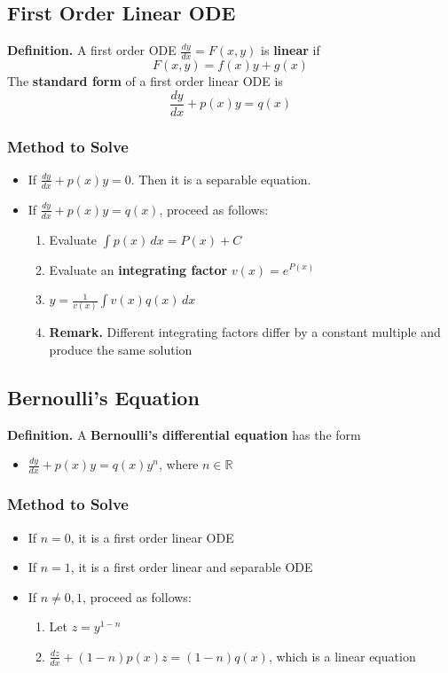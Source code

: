 \documentclass[../ma2002_notes.tex]{subfiles}
\begin{document}
\subsection{First Order Linear ODE}
\textbf{Definition.} A first order ODE \(\displaystyle\frac{dy}{dx}=F(x,y)\) is \textbf{linear} if
\[F(x,y)=f(x)y+g(x)\]
The \textbf{standard form} of a first order linear ODE is
\[\frac{dy}{dx}+p(x)y=q(x)\]

\subsubsection{Method to Solve}
\begin{itemize}
	\item If \(\displaystyle\frac{dy}{dx}+p(x)y=0\). Then it is a separable equation.
	\item If \(\displaystyle\frac{dy}{dx}+p(x)y=q(x)\), proceed as follows:
	\begin{enumerate}
		\item Evaluate \(\int p(x)\,dx=P(x)+C\)
		\item Evaluate an \textbf{integrating factor} \(v(x)=e^{P(x)}\)
		\item\(\displaystyle y=\frac{1}{v(x)}\int v(x)q(x)\,dx\)
		\item\textbf{Remark.} Different integrating factors differ by a constant multiple and produce the same solution
	\end{enumerate}
\end{itemize}

\subsection{Bernoulli's Equation}
\textbf{Definition.} A \textbf{Bernoulli's differential equation} has the form
\begin{itemize}
	\item\(\displaystyle\frac{dy}{dx}+p(x)y=q(x)y^n\), where \(n\in\mathbb{R}\)
\end{itemize}

\subsubsection{Method to Solve}
\begin{itemize}
	\item If \(n=0\), it is a first order linear ODE
	\item If \(n=1\), it is a first order linear and separable ODE
	\item If \(n\ne0,1\), proceed as follows:
	\begin{enumerate}
		\item Let \(z=y^{1-n}\)
		\item\(\displaystyle\frac{dz}{dx}+(1-n)p(x)z=(1-n)q(x)\), which is a linear equation
	\end{enumerate}
\end{itemize}
\end{document}

